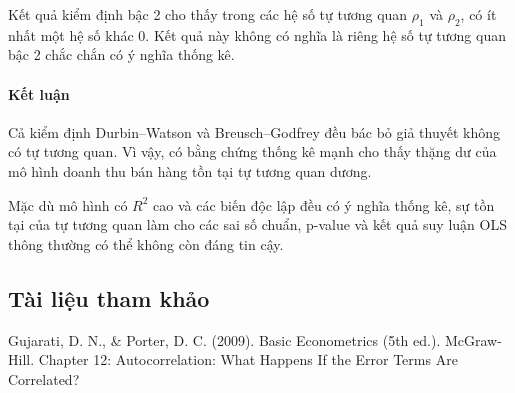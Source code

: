 Kết quả kiểm định bậc 2 cho thấy trong các hệ số tự tương quan
$\rho_1$ và $\rho_2$, có ít nhất một hệ số khác $0$. Kết quả này không
có nghĩa là riêng hệ số tự tương quan bậc 2 chắc chắn có ý nghĩa thống kê.

\paragraph{Kết luận}

Cả kiểm định Durbin--Watson và Breusch--Godfrey đều bác bỏ giả thuyết
không có tự tương quan. Vì vậy, có bằng chứng thống kê mạnh cho thấy
thặng dư của mô hình doanh thu bán hàng tồn tại tự tương quan dương.

Mặc dù mô hình có $R^2$ cao và các biến độc lập đều có ý nghĩa thống kê,
sự tồn tại của tự tương quan làm cho các sai số chuẩn, p-value và kết quả
suy luận OLS thông thường có thể không còn đáng tin cậy.

\subsection{Tài liệu tham khảo}\label{tuxe0i-liux1ec7u-tham-khux1ea3o}

Gujarati, D. N., \& Porter, D. C. (2009). Basic Econometrics (5th ed.).
McGraw-Hill. Chapter 12: Autocorrelation: What Happens If the Error
Terms Are Correlated?


